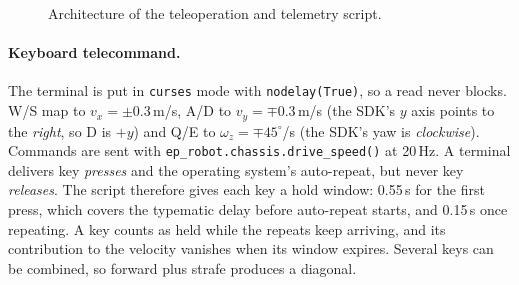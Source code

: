 \documentclass[11pt,a4paper]{article}
\begin{document}
\begin{figure}[H]\centering
{}
\caption{Architecture of the teleoperation and telemetry script.}\label{fig:arch}
\end{figure}

\paragraph{Keyboard telecommand.} The terminal is put in \texttt{curses} mode with \texttt{nodelay(True)}, so a read never blocks. W/S map to $v_x=\pm0.3$\,m/s, A/D to $v_y=\mp0.3$\,m/s (the SDK's $y$ axis points to the \emph{right}, so D is $+y$) and Q/E to $\omega_z=\mp45^\circ$/s (the SDK's yaw is \emph{clockwise}). Commands are sent with \texttt{ep\_robot.chassis.drive\_speed()} at 20\,Hz. A terminal delivers key \emph{presses} and the operating system's auto-repeat, but never key \emph{releases}. The script therefore gives each key a hold window: 0.55\,s for the first press, which covers the typematic delay before auto-repeat starts, and 0.15\,s once repeating. A key counts as held while the repeats keep arriving, and its contribution to the velocity vanishes when its window expires. Several keys can be combined, so forward plus strafe produces a diagonal.
\end{document}

